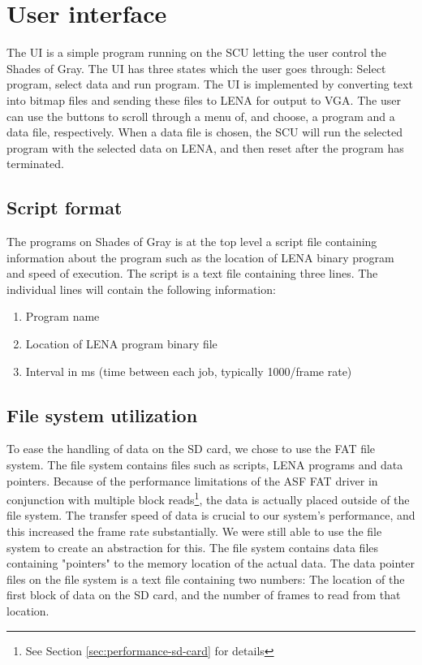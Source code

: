 \section{User interface}
The \ac{UI} is a simple program running on the \ac{SCU} letting the user control the { Shades of Gray}. The \ac{UI} has three states which the user goes through: Select program, select data and run program. The \ac{UI} is implemented by converting text into bitmap files and sending these files to \ac{LENA} for output to VGA. The user can use the buttons to scroll through a menu of, and choose, a program and a data file, respectively. When a data file is chosen, the \ac{SCU} will run the selected program with the selected data on \ac{LENA}, and then reset after the program has terminated.


\subsection{Script format}
The programs on { Shades of Gray} is at the top level a script file
containing information about the program such as the location of \ac{LENA} binary program and speed of execution. The script is a text file containing three lines. The individual lines will
contain the following information:

\begin{enumerate}
\item Program name
\item Location of \ac{LENA} program binary file
\item Interval in ms (time between each job, typically 1000/frame rate)
\end{enumerate}

\subsection{File system utilization}
To ease the handling of data on the SD card, we chose to use the FAT
file system. The file system contains files such as scripts, \ac{LENA}
programs and data pointers. Because of the performance limitations of
the \ac{ASF} FAT driver in conjunction with multiple block
reads\footnote{See Section \ref{sec:performance-sd-card} for details}, the
data is actually placed outside of the file system. The transfer speed
of data is crucial to our system's performance, and this increased the
frame rate substantially. We were still able to use the file system to
create an abstraction for this. The file system contains data files
containing "pointers" to the memory location of the actual data. The
data pointer files on the file system is a text file containing two
numbers: The location of the first block of data on the SD card, and the
number of frames to read from that location.

